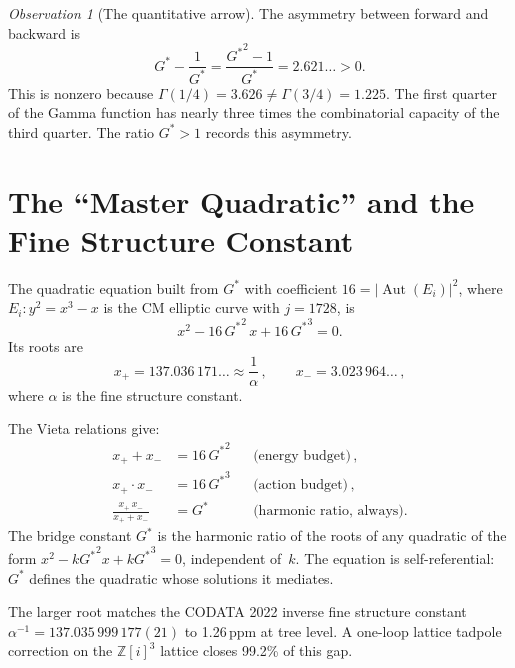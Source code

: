 \documentclass[12pt,reqno]{amsart}
\theoremstyle{definition}
\theoremstyle{remark}
\newtheorem{observation}[theorem]{Observation}
\newcommand{\ZZ}{\mathbb{Z}}
\newcommand{\Gstar}{G^{\!*}}
\newcommand{\abs}[1]{\lvert #1 \rvert}
\newcommand{\Aut}{\operatorname{Aut}}
\begin{document}
\begin{observation}[The quantitative arrow]\label{obs:arrow}
The asymmetry between forward and backward is
\begin{equation}
  \Gstar - \frac{1}{\Gstar} = \frac{{G^*}^2 - 1}{\Gstar} = 2.621\ldots > 0.
\end{equation}
This is nonzero because $\Gamma(1/4) = 3.626 \neq \Gamma(3/4) = 1.225$. The first quarter of the Gamma function has nearly three times the combinatorial capacity of the third quarter. The ratio $\Gstar > 1$ records this asymmetry.
\end{observation}

\section{The ``Master Quadratic'' and the Fine Structure Constant}

The quadratic equation built from $\Gstar$ with coefficient $16 = \abs{\Aut(E_i)}^2$,
where $E_i\colon y^2 = x^3 - x$ is the CM elliptic curve with $j = 1728$, is
\begin{equation}\label{eq:master}
  x^2 - 16\,{G^*}^2\,x + 16\,{G^*}^3 = 0.
\end{equation}
Its roots are
\begin{equation}
  x_+ = 137.036\,171\ldots \approx \frac{1}{\alpha}\,,\qquad
  x_- = 3.023\,964\ldots\,,
\end{equation}
where $\alpha$ is the fine structure constant.

The Vieta relations give:
\begin{align}
  x_+ + x_- &= 16\,{G^*}^2 &&\text{(energy budget)}\,,\\
  x_+ \cdot x_- &= 16\,{G^*}^3 &&\text{(action budget)}\,,\\
  \frac{x_+\,x_-}{x_+ + x_-} &= \Gstar &&\text{(harmonic ratio, always)}.
\end{align}
The bridge constant $\Gstar$ is the harmonic ratio of the roots of any quadratic of the form $x^2 - k{G^*}^2 x + k{G^*}^3 = 0$, independent of~$k$. The equation is self-referential: $\Gstar$ defines the quadratic whose solutions it mediates.

The larger root matches the CODATA 2022 inverse fine structure constant $\alpha^{-1} = 137.035\,999\,177(21)$ \cite{CODATA2022} to 1.26\,ppm at tree level. A one-loop lattice tadpole correction on the $\ZZ[i]^3$ lattice closes 99.2\% of this gap.
\end{document}
